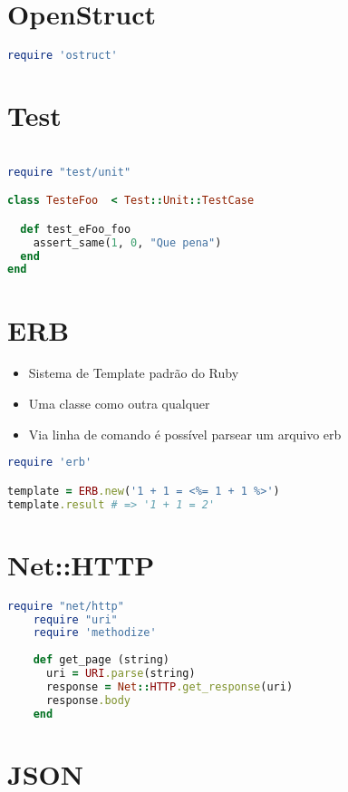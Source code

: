 \documentclass[serif,mathserif]{book}
\begin{document}
\section{OpenStruct}

\begin{lstlisting}[language=ruby]
require 'ostruct'
\end{lstlisting}

\section{Test}

\begin{lstlisting}[language=ruby]

require "test/unit"

class TesteFoo  < Test::Unit::TestCase

  def test_eFoo_foo
    assert_same(1, 0, "Que pena")
  end
end
\end{lstlisting}

\section{ERB}

\begin{itemize}
  \item Sistema de Template padrão do Ruby
  \item Uma classe como outra qualquer
  \item Via linha de comando é possível parsear um arquivo erb
\end{itemize}

\begin{lstlisting}[language=ruby]
require 'erb'

template = ERB.new('1 + 1 = <%= 1 + 1 %>')
template.result # => '1 + 1 = 2'
\end{lstlisting}

\section{Net::HTTP}

\begin{lstlisting}[language=ruby]
	require "net/http"
	require "uri"
	require 'methodize'
	
	def get_page (string)
	  uri = URI.parse(string)
	  response = Net::HTTP.get_response(uri)
	  response.body
	end
\end{lstlisting}

\section{JSON}
\end{document}
